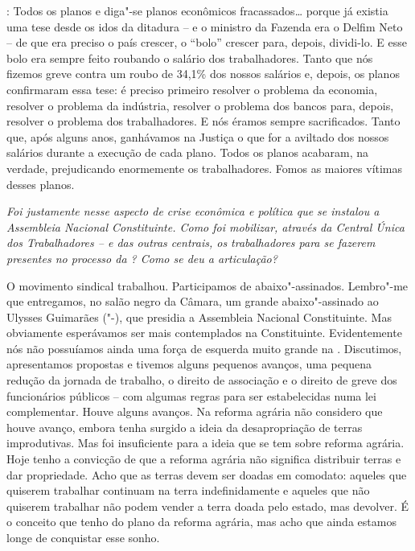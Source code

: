 : Todos os planos e diga"-se planos econômicos
fracassados\ldots{} porque já existia uma tese desde os idos da ditadura -- e o
ministro da Fazenda era o Delfim Neto -- de que era preciso o país
crescer, o ``bolo'' crescer para, depois, dividi-lo. E esse bolo era
sempre feito roubando o salário dos trabalhadores. Tanto que nós fizemos
greve contra um roubo de 34,1\% dos nossos salários e, depois, os planos
confirmaram essa tese: é preciso primeiro resolver o problema da
economia, resolver o problema da indústria, resolver o problema dos
bancos para, depois, resolver o problema dos trabalhadores. E nós éramos
sempre sacrificados. Tanto que, após alguns anos, ganhávamos na Justiça
o que for a aviltado dos nossos salários durante a execução de cada
plano. Todos os planos acabaram, na verdade, prejudicando enormemente os
trabalhadores. Fomos as maiores vítimas desses planos.

\medskip

\noindent\emph{Foi justamente nesse aspecto de crise econômica e política que
se instalou a Assembleia Nacional Constituinte. Como foi mobilizar,
através da Central Única dos Trabalhadores --  e das outras centrais,
os trabalhadores para se fazerem presentes no processo da ? Como se
deu a articulação?}

O movimento sindical trabalhou. Participamos de
abaixo"-assinados. Lembro"-me que entregamos, no salão negro da Câmara, um
grande abaixo"-assinado ao Ulysses Guimarães ("-), que presidia a
Assembleia Nacional Constituinte. Mas obviamente esperávamos ser mais
contemplados na Constituinte. Evidentemente nós não possuíamos ainda uma
força de esquerda muito grande na . Discutimos, apresentamos
propostas e tivemos alguns pequenos avanços, uma pequena redução da
jornada de trabalho, o direito de associação e o direito de greve dos
funcionários públicos -- com algumas regras para ser estabelecidas numa
lei complementar. Houve alguns avanços. Na reforma agrária não considero
que houve avanço, embora tenha surgido a ideia da desapropriação de
terras improdutivas. Mas foi insuficiente para a ideia que se tem sobre
reforma agrária. Hoje tenho a convicção de que a reforma agrária não
significa distribuir terras e dar propriedade. Acho que as terras devem
ser doadas em comodato: aqueles que quiserem trabalhar continuam na
terra indefinidamente e aqueles que não quiserem trabalhar não podem
vender a terra doada pelo estado, mas devolver. É o conceito que tenho
do plano da reforma agrária, mas acho que ainda estamos longe de
conquistar esse sonho.

